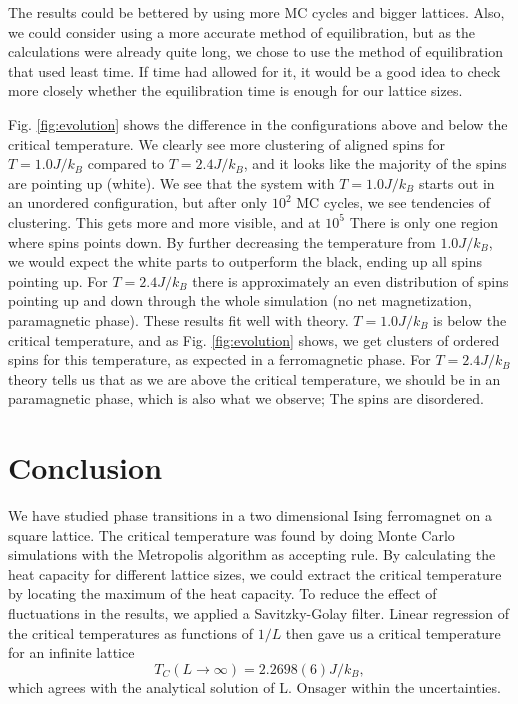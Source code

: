 \documentclass[%
 reprint,
nofootinbib,
aps,
]{revtex4-1}
\begin{document}
The results could be bettered by using more MC cycles and bigger lattices. Also, we could consider using a more accurate method of equilibration, but as the calculations were already quite long, we chose to use the method of equilibration that used least time. If time had allowed for it, it would be a good idea to check more closely whether the equilibration time is enough for our lattice sizes.

Fig. \vref{fig:evolution} shows the difference in the configurations above and below the critical temperature. We clearly see more clustering of aligned spins for $T = 1.0J/k_B$ compared to $T = 2.4J/k_B$, and it looks like the majority of the spins are pointing up (white). We see that the system with $T = 1.0J/k_B$ starts out in an unordered configuration, but after only $10^2$ MC cycles, we see tendencies of clustering. This gets more and more visible, and at $10^5$ There is only one region where spins points down. By further decreasing the temperature from $1.0J/k_B$, we would expect the white parts to outperform the black, ending up all spins pointing up.  For $T = 2.4J/k_B$ there is approximately an even distribution of spins pointing up and down through the whole simulation (no net magnetization, paramagnetic phase). These results fit well with theory. $T = 1.0J/k_B$ is below the critical temperature, and as Fig. \ref{fig:evolution} shows, we get clusters of ordered spins for this temperature, as expected in a ferromagnetic phase. For $T = 2.4J/k_B$ theory tells us that as we are above the critical temperature, we should be in an paramagnetic phase, which is also what we observe; The spins are disordered. 


\section{Conclusion}

We have studied phase transitions in a two dimensional Ising ferromagnet on a square lattice. The critical temperature was found by doing Monte Carlo simulations with the Metropolis algorithm as accepting rule. By calculating the heat capacity for different lattice sizes, we could extract the critical temperature by locating the maximum of the heat capacity. To reduce the effect of fluctuations in the results, we applied a Savitzky-Golay filter. Linear regression of the critical temperatures as functions of $1/L$ then gave us a critical temperature for an infinite lattice
\begin{equation}
T_C(L\to\infty) = 2.2698(6)J/k_B,
\end{equation}
which agrees with the analytical solution of L. Onsager \cite{onsager} within the uncertainties.
\end{document}
